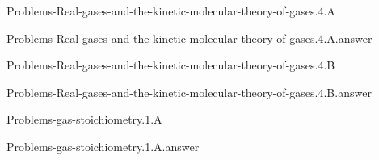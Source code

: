 \documentclass[main.tex]{subfiles}
\newcommand\chapterlabel{}
\begin{document}
\renewcommand\chapterlabel{Ch-Gas}
\begin{question}[ID=\the\value{numA}]
{Problems-Real-gases-and-the-kinetic-molecular-theory-of-gases.4.A}
\end{question}
   \begin{Form}
   \TextField[multiline,backgroundcolor=gray!20,borderwidth=0,width=0.43\textwidth  ,height=115pt, name=\the\value{numA}]  { }\end{Form}
\begin{solution}
{Problems-Real-gases-and-the-kinetic-molecular-theory-of-gases.4.A.answer}
\hspace{0.1cm}
\end{solution}


\renewcommand\chapterlabel{Ch-Gas}
\begin{question}[ID=\the\value{numA}]
{Problems-Real-gases-and-the-kinetic-molecular-theory-of-gases.4.B}
\end{question}
   \begin{Form}
   \TextField[multiline,backgroundcolor=gray!20,borderwidth=0,width=0.43\textwidth  ,height=115pt, name=\the\value{numA}]  { }\end{Form}
\begin{solution}
{Problems-Real-gases-and-the-kinetic-molecular-theory-of-gases.4.B.answer}
\hspace{0.1cm}
\end{solution}


\renewcommand\chapterlabel{Ch-Gas}
\begin{question}[ID=\the\value{numA}]
{Problems-gas-stoichiometry.1.A}
\end{question}
   \begin{Form}
   \TextField[multiline,backgroundcolor=gray!20,borderwidth=0,width=0.43\textwidth  ,height=115pt, name=\the\value{numA}]  { }\end{Form}
\begin{solution}
{Problems-gas-stoichiometry.1.A.answer}
\hspace{0.1cm}
\end{solution}
\end{document}
